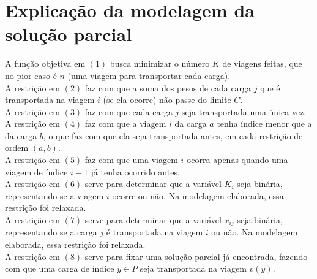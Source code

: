 \documentclass{article}
\begin{document}
\section{Explicação da modelagem da solução parcial}
A função objetiva em $(1)$ busca minimizar o número $K$ de viagens feitas, que no pior caso é $n$ (uma viagem para transportar cada carga).\\
A restrição em $(2)$ faz com que a soma dos pesos de cada carga $j$ que é transportada na viagem $i$ (se ela ocorre) não passe do limite $C$.\\
A restrição em $(3)$ faz com que cada carga $j$ seja transportada uma única vez.\\
A restrição em $(4)$ faz com que a viagem $i$ da carga $a$ tenha índice menor que a da carga $b$, o que faz com que ela seja transportada antes, em cada restrição de ordem $(a, b)$.\\
A restrição em $(5)$ faz com que uma viagem $i$ ocorra apenas quando uma viagem de índice $i-1$ já tenha ocorrido antes.\\
A restrição em $(6)$ serve para determinar que a variável $K_i$ seja binária, representando se a viagem $i$ ocorre ou não. Na modelagem elaborada, essa restrição foi relaxada.\\
A restrição em $(7)$ serve para determinar que a variável $x_{ij}$ seja binária, representando se a carga $j$ é transportada na viagem $i$ ou não. Na modelagem elaborada, essa restrição foi relaxada.\\
A restrição em $(8)$ serve para fixar uma solução parcial já encontrada, fazendo com que uma carga de índice $y \in P$ seja transportada na viagem $v(y)$.

\newpage
\end{document}

